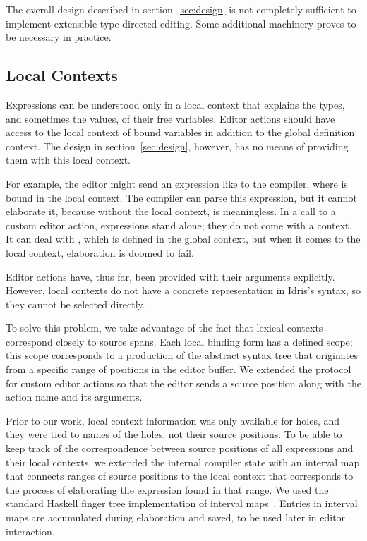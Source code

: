 
The overall design described in section~\ref{sec:design} is not
completely sufficient to implement extensible type-directed
editing. Some additional machinery proves to be necessary in practice.

\subsection{Local Contexts}
\label{ssec:localContext}

Expressions can be understood only in a local context that
explains the types, and sometimes the values, of their free
variables. Editor actions should have access to the local context of
bound variables in addition to the global definition context. The
design in section~\ref{sec:design}, however, has no means of providing
them with this local context.

For example, the editor might send an expression like  to the compiler, where  is bound in the local context.
The compiler can parse this expression, but it cannot elaborate it,
because without the local context,  is meaningless. In a call to
a custom editor action, expressions stand alone; they do not come with
a context. It can deal with , which is defined in the global
context, but when it comes to the local context, elaboration is doomed
to fail.

Editor actions have, thus far, been provided with their arguments
explicitly. However, local contexts do not have a concrete
representation in Idris's syntax, so they cannot be selected directly.

To solve this problem, we take advantage of the fact that lexical
contexts correspond closely to source spans. Each local binding form
has a defined scope; this scope corresponds to a production of the
abstract syntax tree that originates from a specific range of
positions in the editor buffer. We extended the protocol for custom
editor actions so that the editor sends a source position along with
the action name and its arguments.

Prior to our work, local context information was only available for holes, and
they were tied to names of the holes, not their source positions. To be able to
keep track of the correspondence between source positions of all expressions
and their local contexts, we extended the internal compiler state with an
interval map that connects ranges of source positions to the local
context that corresponds to the process of elaborating the expression
found in that range. We used the standard Haskell finger tree
implementation of interval maps~\cite{fingertrees}.
Entries in interval maps are accumulated during elaboration and saved, to be
used later in editor interaction.

